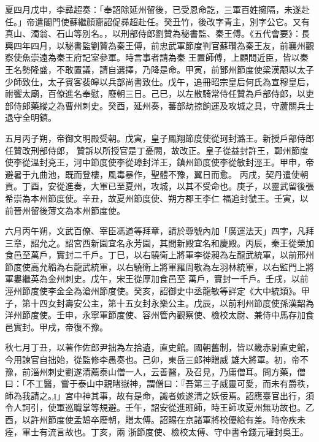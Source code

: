 \begin{pinyinscope}
 夏四月戊申，李彞超奏：「奉詔除延州留後，已受恩命訖，三軍百姓擁隔，未遂赴任。」帝遣閣門使蘇繼顏齎詔促彞超赴任。癸丑竹，後改字青主，別字公它。又有真山、濁翁、石山等別名。，以刑部侍郎劉贊為秘書監、秦王傅。《五代會要》：長興四年四月，以秘書監劉贊為秦王傅，前忠武軍節度判官蘇瓚為秦王友，前襄州觀察使魚崇遠為秦王府記室參軍。時言事者請為秦
 王置師傅，上顧問近臣，皆以秦王名勢隆盛，不敢置議，請自選擇，乃降是命。甲寅，前鄧州節度使梁漢顒以太子少師致仕，太子賓客裴皞以兵部尚書致仕。戊午，追冊昭宗皇后何氏為宣穆皇后，祔饗太廟，百僚進名奉慰，廢朝三日。己巳，以左散騎常侍任贊為戶部侍郎，以吏部侍郎藥縱之為曹州刺史。癸酉，延州奏，蕃部劫掠餉運及攻城之具，守蘆關兵士退守全明鎮。


五月丙子朔，帝御文明殿受朝。戊寅，皇子鳳翔節度使從珂封潞王。新授戶部侍郎任贊改刑部侍郎，
 贊訴以所授官是丁憂闕，故改正。皇子從益封許王，鄆州節度使李從溫封兗王，河中節度使李從璋封洋王，鎮州節度使李從敏封涇王。甲申，帝避暑于九曲池，既而登樓，風毒暴作，聖體不豫，翼日而愈。
 丙戌，契丹遣使朝貢。丁酉，安從進奏，大軍已至夏州，攻城，以其不受命也。庚子，以靈武留後張希崇為本州節度使。辛丑，故夏州節度使、朔方郡王李仁
 福追封虢王。壬寅，以前晉州留後薄文為本州節度使。



 六月丙午朔，文武百僚、宰臣馮道等拜章，請於尊號內加「廣運法天」四字，凡拜三章，詔允之。詔宮西新園宜名永芳園，其間新殿宜名和慶殿。丙辰，秦王從榮加食邑至萬戶，實封二千戶。丁巳，以右驍衛上將軍李從昶為左龍武統軍，以前邢州節度使高允韜為右龍武統軍，以右驍衛上將軍羅周敬為左羽林統軍，以右監門上將軍婁繼英為金州刺史。戊午，宋王從厚加食邑至
 萬戶，實封一千戶。壬戌，以前涇州節度使李金全為滄州節度使。癸亥，詔御史中丞龍敏等詳定《大中統類》。甲子，第十四女封壽安公主，第十五女封永樂公主。戊辰，以前利州節度使孫漢韶為洋州節度使。壬申，永寧軍節度使、容州管內觀察使、檢校太尉、兼侍中馬存加食邑實封。甲戌，帝復不豫。



 秋七月丁丑，以著作佐郎尹拙為左拾遺，直史館。國朝舊制，皆以畿赤尉直史館，今用諫官自拙始，從監修李愚奏也。己卯，東岳三郎神贈威
 雄大將軍。初，帝不豫，前淄州刺史劉遂清薦泰山僧一人，云善醫，及召見，乃庸僧耳。問方藥，僧曰：「不工醫，嘗于泰山中親睹嶽神，謂僧曰：『吾第三子威靈可愛，而未有爵秩，師為我請之。』」宮中神其事，故有是命，識者嫉遂清之妖佞焉。詔應臺官出行，須令人訶引，使軍巡職掌等規避。壬午，詔安從進班師，時王師攻夏州無功故也。乙酉，以許州節度使孟鵠卒廢朝，贈太傅。詔賜在京諸軍將校優給有差。時帝疾未痊，軍士有流言故也。丁亥，兩
 浙節度使、檢校太傅、守中書令錢元瓘封吳王。




\end{pinyinscope}

